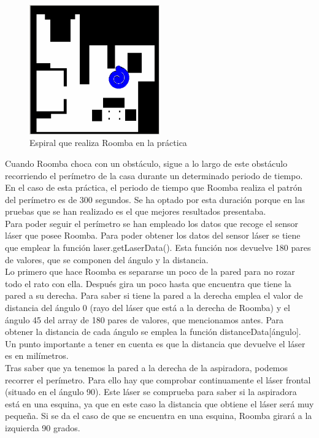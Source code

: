 \begin{figure}[H]
  \begin{center}
    \includegraphics[width=0.5\textwidth]{figures/Vacuum/Espiral_Roomba.png}
		\caption{Espiral que realiza Roomba en la práctica}
		\label{fig.Espiral_Roomba}
		\end{center}
\end{figure}

Cuando Roomba choca con un obstáculo, sigue a lo largo de este obstáculo recorriendo el perímetro de la casa durante un determinado periodo de tiempo. En el caso de esta práctica, el periodo de tiempo que Roomba realiza el patrón del perímetro es de 300 segundos. Se ha optado por esta duración porque en las pruebas que se han realizado es el que mejores resultados presentaba.\\

Para poder seguir el perímetro se han empleado los datos que recoge el sensor láser que posee Roomba. Para poder obtener los datos del sensor láser se tiene que emplear la función laser.getLaserData(). Esta función nos devuelve 180 pares de valores, que se componen del ángulo y la distancia.\\

Lo primero que hace Roomba es separarse un poco de la pared para no rozar todo el rato con ella. Después gira un poco hasta que encuentra que tiene la pared a su derecha. Para saber si tiene la pared a la derecha emplea el valor de distancia del ángulo 0 (rayo del láser que está a la derecha de Roomba) y el ángulo 45 del array de 180 pares de valores, que mencionamos antes. Para obtener la distancia de cada ángulo se emplea la función distanceData[ángulo]. Un punto importante a tener en cuenta es que la distancia que devuelve el láser es en milímetros. \\

Tras saber que ya tenemos la pared a la derecha de la aspiradora, podemos recorrer el perímetro. Para ello hay que comprobar continuamente el láser frontal (situado en el ángulo 90). Este láser se comprueba para saber si la aspiradora está en una esquina, ya que en este caso la distancia que obtiene el láser será muy pequeña. Si se da el caso de que se encuentra en una esquina, Roomba girará a la izquierda 90 grados. \\

